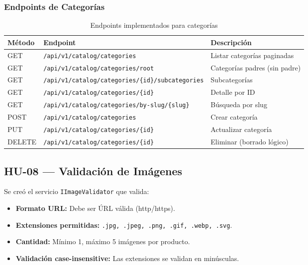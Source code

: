 \documentclass[12pt,a4paper]{article}
\begin{document}
\subsubsection{Endpoints de Categor\'ias}
\begin{table}[H]\centering
\begin{tabularx}{\textwidth}{l l X}
\toprule\rowcolor{lightblue}
\textbf{M\'etodo} & \textbf{Endpoint} & \textbf{Descripci\'on}\\
\midrule
GET & \texttt{/api/v1/catalog/categories} & Listar categor\'ias paginadas\\
\rowcolor{lightgray}
GET & \texttt{/api/v1/catalog/categories/root} & Categor\'ias padres (sin padre)\\
GET & \texttt{/api/v1/catalog/categories/\{id\}/subcategories} & Subcategor\'ias\\
\rowcolor{lightgray}
GET & \texttt{/api/v1/catalog/categories/\{id\}} & Detalle por ID\\
GET & \texttt{/api/v1/catalog/categories/by-slug/\{slug\}} & B\'usqueda por slug\\
\rowcolor{lightgray}
POST & \texttt{/api/v1/catalog/categories} & Crear categor\'ia\\
PUT & \texttt{/api/v1/catalog/categories/\{id\}} & Actualizar categor\'ia\\
\rowcolor{lightgray}
DELETE & \texttt{/api/v1/catalog/categories/\{id\}} & Eliminar (borrado l\'ogico)\\
\bottomrule
\end{tabularx}
\caption{Endpoints implementados para categor\'ias}
\end{table}

\subsection{HU-08 --- Validaci\'on de Im\'agenes}

Se cre\'o el servicio \texttt{IImageValidator} que valida:

\begin{itemize}[leftmargin=1.5em]
  \item \textbf{Formato URL:} Debe ser \'URL v\'alida (http/https).
  \item \textbf{Extensiones permitidas:} \texttt{.jpg, .jpeg, .png, .gif, .webp, .svg}.
  \item \textbf{Cantidad:} M\'inimo 1, m\'aximo 5 im\'agenes por producto.
  \item \textbf{Validaci\'on case-insensitive:} Las extensiones se validan en min\'usculas.
\end{itemize}
\end{document}
